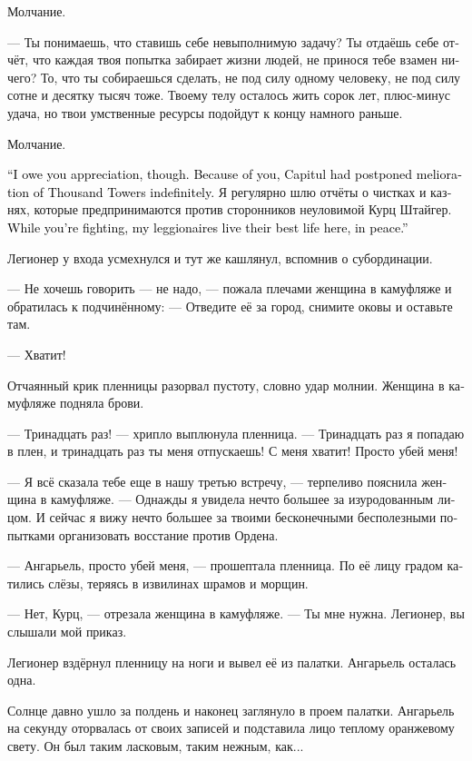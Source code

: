\documentclass[a4paper,12pt,fleqn]{book}\usepackage{cooltooltips}\usepackage{polyglossia}\setdefaultlanguage[babelshorthands=true]{russian}\setotherlanguage{english}\defaultfontfeatures{Ligatures=TeX,Mapping=tex-text} \usepackage{xcolor}\definecolor{lightgray}{HTML}{bbbbbb}\color{lightgray}\newcommand{\ml}[3]{\textenglish{\textcolor{black}{#3}}}
\begin{document}
Молчание.

--- Ты понимаешь, что ставишь себе невыполнимую задачу?
Ты отдаёшь себе отчёт, что каждая твоя попытка забирает жизни людей, не принося тебе взамен ничего?
То, что ты собираешься сделать, не под силу одному человеку, не под силу сотне и десятку тысяч тоже.
Твоему телу осталось жить сорок лет, плюс-минус удача, но твои умственные ресурсы подойдут к концу намного раньше.

Молчание.

\ml{$0$}
{--- Я должна тебя поблагодарить, впрочем.}
{``I owe you appreciation, though.}
\ml{$0$}
{Благодаря тебе Капитул отложил мелиорацию Тысячи Башен на неопределённый срок.}
{Because of you, Capitul had postponed melioration of Thousand Towers indefinitely.}
Я регулярно шлю отчёты о чистках и казнях, которые предпринимаются против сторонников неуловимой Курц Штайгер.
\ml{$0$}
{Пока ты борешься, мои легионеры живут здесь, мирно и счастливо.}
{While you're fighting, my leggionaires live their best life here, in peace.''}

Легионер у входа усмехнулся и тут же кашлянул, вспомнив о субординации.

--- Не хочешь говорить --- не надо, --- пожала плечами женщина в камуфляже и обратилась к подчинённому:
--- Отведите её за город, снимите оковы и оставьте там.

--- Хватит!

Отчаянный крик пленницы разорвал пустоту, словно удар молнии.
Женщина в камуфляже подняла брови.

--- Тринадцать раз! --- хрипло выплюнула пленница.
--- Тринадцать раз я попадаю в плен, и тринадцать раз ты меня отпускаешь!
С меня хватит!
Просто убей меня!

--- Я всё сказала тебе еще в нашу третью встречу, --- терпеливо пояснила женщина в камуфляже.
--- Однажды я увидела нечто большее за изуродованным лицом.
И сейчас я вижу нечто большее за твоими бесконечными бесполезными попытками организовать восстание против Ордена.

--- Ангарьель, просто убей меня, --- прошептала пленница.
По её лицу градом катились слёзы, теряясь в извилинах шрамов и морщин.

--- Нет, Курц, --- отрезала женщина в камуфляже.
--- Ты мне нужна.
Легионер, вы слышали мой приказ.

Легионер вздёрнул пленницу на ноги и вывел её из палатки.
Ангарьель осталась одна.

Солнце давно ушло за полдень и наконец заглянуло в проем палатки.
Ангарьель на секунду оторвалась от своих записей и подставила лицо теплому оранжевому свету.
Он был таким ласковым, таким нежным, как...
\end{document}

